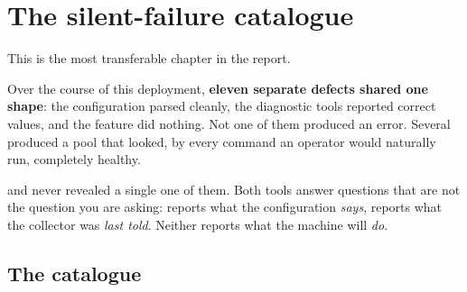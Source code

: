 \section{The silent-failure catalogue}
\label{sec:silent}

This is the most transferable chapter in the report.

Over the course of this deployment, \textbf{eleven separate defects shared one
shape}: the configuration parsed cleanly, the diagnostic tools reported correct
values, and the feature did nothing. Not one of them produced an error. Several
produced a pool that looked, by every command an operator would naturally run,
completely healthy.

\begin{keypoint}
 and  never revealed a single one of
them. Both tools answer questions that are not the question you are asking:
 reports what the configuration \emph{says},
 reports what the collector was \emph{last told}. Neither
reports what the machine will \emph{do}.
\end{keypoint}

\subsection{The catalogue}


